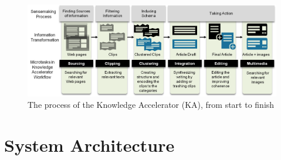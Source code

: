 \begin{figure}
    \centering
    \includegraphics[width=1\columnwidth]{Chapters/KA/overview}
    \caption{The process of the Knowledge Accelerator (KA), from start to finish}
    \label{fig:process}
\end{figure}

\section{System Architecture}



